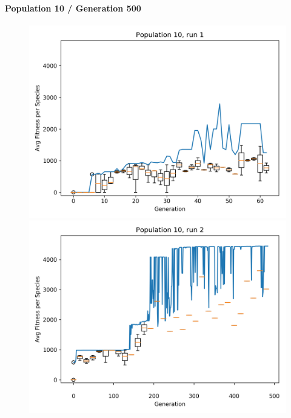 		\paragraph{Population 10 / Generation 500}
			\label{par:mario10}
			\begin{figure}[h]
				\centering
				\begin{minipage}{0.33\textwidth}
					\centering
					\includegraphics[width=1\textwidth]{graphics/mario/pop10_run1} %
				\end{minipage}\hfill
				\begin{minipage}{0.33\textwidth}
					\centering
					\includegraphics[width=1\textwidth]{graphics/mario/pop10_run2} %

\end{minipage}
\end{figure}
